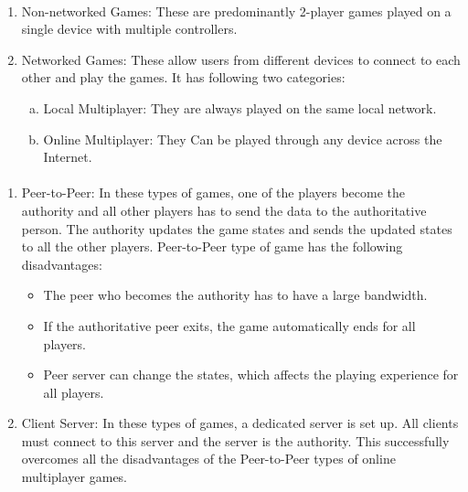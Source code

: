 \documentclass[oneside,12pt]{Classes/VTU}
\begin{document}
	\paragraph{}
	\begin{enumerate}
		\item Non-networked Games: These are predominantly 2-player games played on a single device with multiple controllers.
		\item Networked Games: These allow users from different devices to connect to each other and play the games. It has following two categories: 
		\begin{enumerate}[a.]
			\item Local Multiplayer: They are always played on the same local network.
			\item Online Multiplayer: They Can be played through any device across the Internet.
		\end{enumerate}
	\end{enumerate}
	
	\paragraph{}
	\begin{enumerate}
		\item Peer-to-Peer: In these types of games, one of the players become the authority and all other players has to send the data to the authoritative person. The authority updates the game states and sends the updated states to all the other players. Peer-to-Peer type of game has the following disadvantages:
		\begin{itemize}
			\item The peer who becomes the authority has to have a large bandwidth.
			\item If the authoritative peer exits, the game automatically ends for all players. 
			\item Peer server can change the states, which affects the playing experience for all players.
		\end{itemize}
		\item Client Server: In these types of games, a dedicated server is set up. All clients must connect to this server and the server is the authority. This successfully overcomes all the disadvantages of the Peer-to-Peer types of online multiplayer games. 
	\end{enumerate}
	
\end{document}
